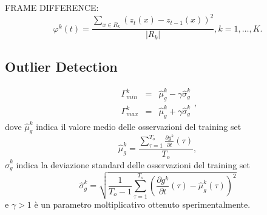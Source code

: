 \documentclass{llncs}
\begin{document}
%
%
%
%

FRAME DIFFERENCE:
\begin{equation}
	\label{eq:frameDiffReg}
	\varphi^k(t) = \frac{\sum_{x \in R_k}(z_t(x) - z_{t-1}(x))^2}{|R_k|}, k=1,\dots,K.
\end{equation}

\subsection{Outlier Detection}\label{subsec:MonitoringScheme}



\begin{equation}
\label{eq:soglieGradiente}
\begin{array}{lcl}
\Gamma_{min}^k & = & \hat{\mu}_g^k -\gamma \hat{\sigma}_g^k\\
\Gamma_{max}^k & = & \hat{\mu}_g^k + \gamma \hat{\sigma}_g^k
\end{array},
\end{equation}
dove $\hat{\mu}_g^k$ indica il valore medio delle osservazioni del training set
\begin{equation}
\hat{\mu}_g^k = \frac{\sum_{\tau = 1}^{T_{o}} \frac{\partial g^k}{\partial t}(\tau)}{T_{o}}, \nonumber
\end{equation}
$\hat{\sigma}_g^k$ indica la deviazione standard delle osservazioni del training set
\begin{equation}
\hat{\sigma}_g^k  = \sqrt{\frac{1}{T_{o}-1}\sum_{\tau=1}^{T_{o}}\left(\frac{\partial g^k}{\partial t}(\tau) - \hat{\mu}_g^k(\tau)\right)^2} \nonumber
\end{equation}
e $\gamma>1$ \`e un parametro moltiplicativo ottenuto sperimentalmente.\\
\end{document}
